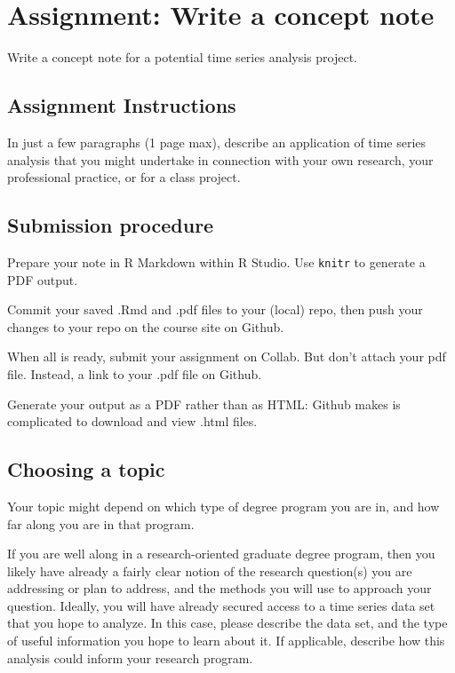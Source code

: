 \documentclass[
]{book}
\begin{document}
\hypertarget{assignment-write-a-concept-note}{%
\chapter{Assignment: Write a concept note}\label{assignment-write-a-concept-note}}

Write a concept note for a potential time series analysis project.

\hypertarget{assignment-instructions}{%
\section{Assignment Instructions}\label{assignment-instructions}}

In just a few paragraphs (1 page max), describe an application of time series analysis that you might undertake in connection with your own research, your professional practice, or for a class project.

\hypertarget{submission-procedure}{%
\section{Submission procedure}\label{submission-procedure}}

Prepare your note in R Markdown within R Studio. Use \texttt{knitr} to generate a PDF output.

Commit your saved .Rmd and .pdf files to your (local) repo, then push your changes to your repo on the course site on Github.

When all is ready, submit your assignment on Collab. But don't attach your pdf file. Instead, a link to your .pdf file on Github.

Generate your output as a PDF rather than as HTML: Github makes is complicated to download and view .html files.

\hypertarget{choosing-a-topic}{%
\section{Choosing a topic}\label{choosing-a-topic}}

Your topic might depend on which type of degree program you are in, and how far along you are in that program.

If you are well along in a research-oriented graduate degree program, then you likely have already a fairly clear notion of the research question(s) you are addressing or plan to address, and the methods you will use to approach your question. Ideally, you will have already secured access to a time series data set that you hope to analyze. In this case, please describe the data set, and the type of useful information you hope to learn about it. If applicable, describe how this analysis could inform your research program.
\end{document}
